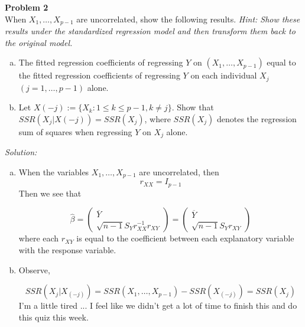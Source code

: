 \documentclass{article}
\newenvironment{problem}[2][Problem]
    { \begin{mdframed}[backgroundcolor=gray!20] \textbf{#1 #2} \\}
    {  \end{mdframed}}
\newenvironment{solution}
    {\textit{Solution:}}
    {}
\begin{document}
\begin{problem}{2}
When $X_1, \ldots , X_{p-1}$ are uncorrelated, show the following results. \emph{Hint: Show these results under the standardized regression model and then transform them back to the original model.}
\begin{enumerate}[(a)]
\item The fitted regression coefficients of regressing $Y$ on $(X_1, \ldots , X_{p - 1})$ equal to the fitted regression coefficients of regressing $Y$ on each individual $X_j$ $(j = 1, \ldots , p - 1)$ alone.
\item  Let $X( - j) := \{ X_k : 1 \leq k \leq p - 1, k \not = j \}$. Show that $SSR(X_j | X(-j)) = SSR(X_j)$, where $SSR(X_j)$ denotes the regression sum of squares when regressing $Y$ on $X_j$ alone.
\end{enumerate}
\end{problem}
\begin{solution}
\begin{enumerate}[(a)]
\item When the variables $X_1, \ldots, X_{p - 1}$ are uncorrelated, then 
$$r_{XX} = I_{p - 1}$$
Then we see that 

$$\hat \beta = \begin{pmatrix}
\overline{Y} \\
\sqrt{n - 1} S_Y r_{XX}^{-1} r_{XY} 
\end{pmatrix} = \begin{pmatrix}
\overline{Y} \\
\sqrt{n - 1} S_Y r_{XY} 
\end{pmatrix}$$
where each $r_{XY}$ is equal to the coefficient between each explanatory variable with the response variable. 
\item Observe, 

$$SSR(X_j | X_{(-j)}) = SSR(X_1, \ldots, X_{p - 1}) - SSR(X_{(-j)}) = SSR(X_j)$$
I'm a little tired ... I feel like we didn't get a lot of time to finish this and do this quiz this week. 
\end{enumerate}
\end{solution}
\end{document}
